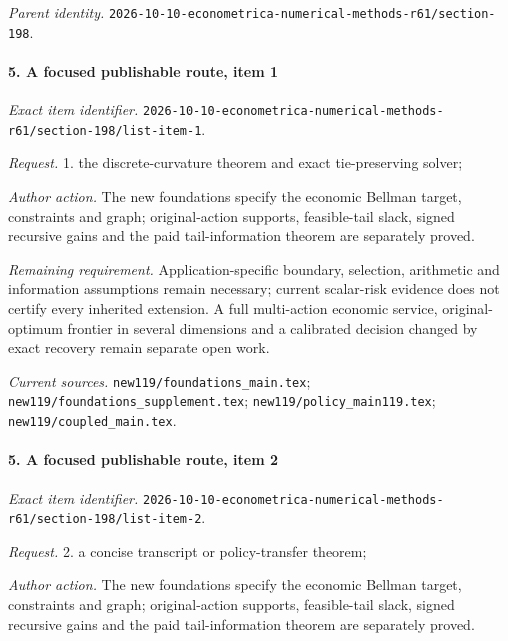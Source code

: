 \par\emph{Parent identity.} \nolinkurl{2026-10-10-econometrica-numerical-methods-r61/section-198}.

\paragraph{5. A focused publishable route, item 1}

\emph{Exact item identifier.} \nolinkurl{2026-10-10-econometrica-numerical-methods-r61/section-198/list-item-1}.

\par\emph{Request.} 1. the discrete-curvature theorem and exact tie-preserving solver;

\par\emph{Author action.} The new foundations specify the economic Bellman target, constraints and graph; original-action supports, feasible-tail slack, signed recursive gains and the paid tail-information theorem are separately proved.

\par\emph{Remaining requirement.} Application-specific boundary, selection, arithmetic and information assumptions remain necessary; current scalar-risk evidence does not certify every inherited extension. A full multi-action economic service, original-optimum frontier in several dimensions and a calibrated decision changed by exact recovery remain separate open work.

\par\emph{Current sources.} \nolinkurl{new119/foundations_main.tex}; \nolinkurl{new119/foundations_supplement.tex}; \nolinkurl{new119/policy_main119.tex}; \nolinkurl{new119/coupled_main.tex}.

\paragraph{5. A focused publishable route, item 2}

\emph{Exact item identifier.} \nolinkurl{2026-10-10-econometrica-numerical-methods-r61/section-198/list-item-2}.

\par\emph{Request.} 2. a concise transcript or policy-transfer theorem;

\par\emph{Author action.} The new foundations specify the economic Bellman target, constraints and graph; original-action supports, feasible-tail slack, signed recursive gains and the paid tail-information theorem are separately proved.

